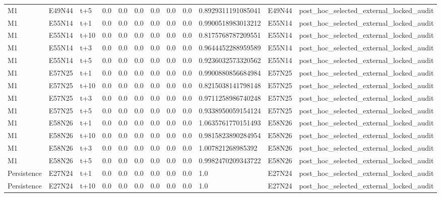 \begin{landscape}
\begin{longtable}{llllllllllll}
M1 & E49N44 & t+5 & 0.0 & 0.0 & 0.0 & 0.0 & 0.0 & 0.0 & 0.8929311191085041 & E49N44 & post\_hoc\_selected\_external\_locked\_audit \\
M1 & E55N14 & t+1 & 0.0 & 0.0 & 0.0 & 0.0 & 0.0 & 0.0 & 0.9900518983013212 & E55N14 & post\_hoc\_selected\_external\_locked\_audit \\
M1 & E55N14 & t+10 & 0.0 & 0.0 & 0.0 & 0.0 & 0.0 & 0.0 & 0.8175768787209551 & E55N14 & post\_hoc\_selected\_external\_locked\_audit \\
M1 & E55N14 & t+3 & 0.0 & 0.0 & 0.0 & 0.0 & 0.0 & 0.0 & 0.9644452288959589 & E55N14 & post\_hoc\_selected\_external\_locked\_audit \\
M1 & E55N14 & t+5 & 0.0 & 0.0 & 0.0 & 0.0 & 0.0 & 0.0 & 0.9236032573320562 & E55N14 & post\_hoc\_selected\_external\_locked\_audit \\
M1 & E57N25 & t+1 & 0.0 & 0.0 & 0.0 & 0.0 & 0.0 & 0.0 & 0.9900880856684984 & E57N25 & post\_hoc\_selected\_external\_locked\_audit \\
M1 & E57N25 & t+10 & 0.0 & 0.0 & 0.0 & 0.0 & 0.0 & 0.0 & 0.8215038141798148 & E57N25 & post\_hoc\_selected\_external\_locked\_audit \\
M1 & E57N25 & t+3 & 0.0 & 0.0 & 0.0 & 0.0 & 0.0 & 0.0 & 0.9711258986740248 & E57N25 & post\_hoc\_selected\_external\_locked\_audit \\
M1 & E57N25 & t+5 & 0.0 & 0.0 & 0.0 & 0.0 & 0.0 & 0.0 & 0.9338950059154124 & E57N25 & post\_hoc\_selected\_external\_locked\_audit \\
M1 & E58N26 & t+1 & 0.0 & 0.0 & 0.0 & 0.0 & 0.0 & 0.0 & 1.0635761770151493 & E58N26 & post\_hoc\_selected\_external\_locked\_audit \\
M1 & E58N26 & t+10 & 0.0 & 0.0 & 0.0 & 0.0 & 0.0 & 0.0 & 0.9815823890284954 & E58N26 & post\_hoc\_selected\_external\_locked\_audit \\
M1 & E58N26 & t+3 & 0.0 & 0.0 & 0.0 & 0.0 & 0.0 & 0.0 & 1.007821268985392 & E58N26 & post\_hoc\_selected\_external\_locked\_audit \\
M1 & E58N26 & t+5 & 0.0 & 0.0 & 0.0 & 0.0 & 0.0 & 0.0 & 0.9982470209343722 & E58N26 & post\_hoc\_selected\_external\_locked\_audit \\
Persistence & E27N24 & t+1 & 0.0 & 0.0 & 0.0 & 0.0 & 0.0 & 0.0 & 1.0 & E27N24 & post\_hoc\_selected\_external\_locked\_audit \\
Persistence & E27N24 & t+10 & 0.0 & 0.0 & 0.0 & 0.0 & 0.0 & 0.0 & 1.0 & E27N24 & post\_hoc\_selected\_external\_locked\_audit \\

\end{longtable}
\end{landscape}
